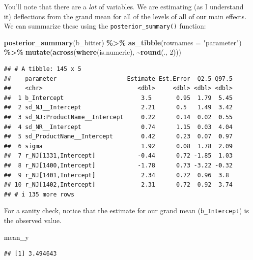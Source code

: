 \documentclass[
]{book}
\newenvironment{Shaded}{\begin{snugshade}}{\end{snugshade}}
\newcommand{\AttributeTok}[1]{\textcolor[rgb]{0.13,0.29,0.53}{#1}}
\newcommand{\DecValTok}[1]{\textcolor[rgb]{0.00,0.00,0.81}{#1}}
\newcommand{\FunctionTok}[1]{\textcolor[rgb]{0.13,0.29,0.53}{\textbf{#1}}}
\newcommand{\NormalTok}[1]{#1}
\newcommand{\SpecialCharTok}[1]{\textcolor[rgb]{0.81,0.36,0.00}{\textbf{#1}}}
\newcommand{\StringTok}[1]{\textcolor[rgb]{0.31,0.60,0.02}{#1}}
\begin{document}
You'll note that there are a \emph{lot} of variables. We are estimating (as I understand it) deflections from the grand mean for all of the levels of all of our main effects. We can summarize these using the \texttt{posterior\_summary()} function:

\begin{Shaded}
\begin{Highlighting}[]
\FunctionTok{posterior\_summary}\NormalTok{(b\_bitter) }\SpecialCharTok{\%\textgreater{}\%}
  \FunctionTok{as\_tibble}\NormalTok{(}\AttributeTok{rownames =} \StringTok{"parameter"}\NormalTok{) }\SpecialCharTok{\%\textgreater{}\%}
  \FunctionTok{mutate}\NormalTok{(}\FunctionTok{across}\NormalTok{(}\FunctionTok{where}\NormalTok{(is.numeric), }\SpecialCharTok{\textasciitilde{}}\FunctionTok{round}\NormalTok{(., }\DecValTok{2}\NormalTok{)))}
\end{Highlighting}
\end{Shaded}

\begin{verbatim}
## # A tibble: 145 x 5
##    parameter                    Estimate Est.Error  Q2.5 Q97.5
##    <chr>                           <dbl>     <dbl> <dbl> <dbl>
##  1 b_Intercept                      3.5       0.95  1.79  5.45
##  2 sd_NJ__Intercept                 2.21      0.5   1.49  3.42
##  3 sd_NJ:ProductName__Intercept     0.22      0.14  0.02  0.55
##  4 sd_NR__Intercept                 0.74      1.15  0.03  4.04
##  5 sd_ProductName__Intercept        0.42      0.23  0.07  0.97
##  6 sigma                            1.92      0.08  1.78  2.09
##  7 r_NJ[1331,Intercept]            -0.44      0.72 -1.85  1.03
##  8 r_NJ[1400,Intercept]            -1.78      0.73 -3.22 -0.32
##  9 r_NJ[1401,Intercept]             2.34      0.72  0.96  3.8 
## 10 r_NJ[1402,Intercept]             2.31      0.72  0.92  3.74
## # i 135 more rows
\end{verbatim}

For a sanity check, notice that the estimate for our grand mean (\texttt{b\_Intercept}) is the observed value.

\begin{Shaded}
\begin{Highlighting}[]
\NormalTok{mean\_y}
\end{Highlighting}
\end{Shaded}

\begin{verbatim}
## [1] 3.494643
\end{verbatim}
\end{document}
